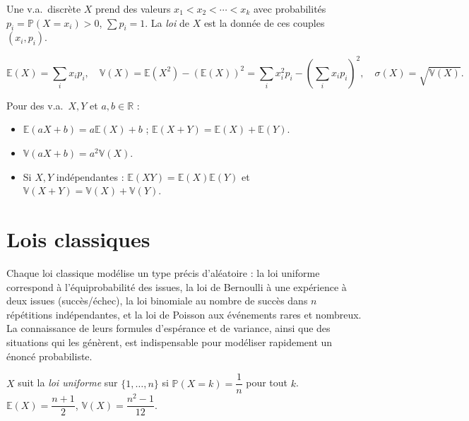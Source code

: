 \documentclass[11pt,a4paper,twoside]{book}
\newcommand{\R}{\mathbb{R}}
\begin{document}
\begin{definitionbox}
Une v.a.\ discrète $X$ prend des valeurs $x_1<x_2<\cdots<x_k$ avec probabilités $p_i=\mathbb{P}(X=x_i)>0$, $\sum p_i=1$.
La \emph{loi} de $X$ est la donnée de ces couples $(x_i,p_i)$.
\end{definitionbox}

\begin{definitionbox}
\[
  \mathbb{E}(X)=\sum_i x_i p_i, \quad
  \mathbb{V}(X)=\mathbb{E}(X^2)-(\mathbb{E}(X))^2=\sum_i x_i^2 p_i - \left(\sum_i x_i p_i\right)^2, \quad
  \sigma(X)=\sqrt{\mathbb{V}(X)}.
\]
\end{definitionbox}

\begin{theoremebox}
Pour des v.a.\ $X,Y$ et $a,b\in\R$ :
\begin{itemize}
  \item $\mathbb{E}(aX+b)=a\mathbb{E}(X)+b$ ; $\mathbb{E}(X+Y)=\mathbb{E}(X)+\mathbb{E}(Y)$.
  \item $\mathbb{V}(aX+b)=a^2\mathbb{V}(X)$.
  \item Si $X,Y$ indépendantes : $\mathbb{E}(XY)=\mathbb{E}(X)\mathbb{E}(Y)$ et $\mathbb{V}(X+Y)=\mathbb{V}(X)+\mathbb{V}(Y)$.
\end{itemize}
\end{theoremebox}

\section{Lois classiques}

Chaque loi classique modélise un type précis d'aléatoire : la loi uniforme correspond à l'équiprobabilité des issues, la loi de Bernoulli à une expérience à deux issues (succès/échec), la loi binomiale au nombre de succès dans $n$ répétitions indépendantes, et la loi de Poisson aux événements rares et nombreux. La connaissance de leurs formules d'espérance et de variance, ainsi que des situations qui les génèrent, est indispensable pour modéliser rapidement un énoncé probabiliste.

\begin{definitionbox}
$X$ suit la \emph{loi uniforme} sur $\{1,\ldots,n\}$ si $\mathbb{P}(X=k)=\dfrac{1}{n}$ pour tout $k$.
$\mathbb{E}(X)=\dfrac{n+1}{2}$, $\mathbb{V}(X)=\dfrac{n^2-1}{12}$.
\end{definitionbox}
\end{document}
